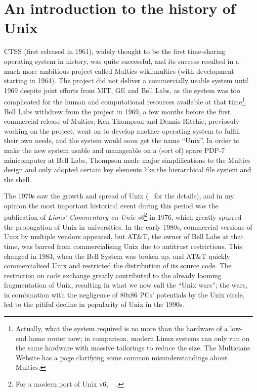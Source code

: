 \newpart
\section{An introduction to the history of Unix}\label{sec:intro}

CTSS (first released in 1961), widely thought to be the
first time-sharing operating system in history, was quite successful, and its
success resulted in a much more ambitious project called Multics\cupercite%
{wiki:multics} (with development starting in 1964).  The project did not deliver
a commercially usable system until 1969 despite
joint efforts from MIT, GE and Bell Labs, as the system was too complicated
for the human and computational resources available at that time\footnote%
{\label{fn:multics}Actually, what the system required is no more than the
hardware of a low-end home router now; in comparison, modern Linux systems can
only run on the same hardware with massive tailorings to reduce the size.  The
Multicians Website has a page clarifying some common
misunderstandings about Multics.}.  Bell Labs withdrew from the project in 1969,
a few months before the first commercial release of Multics; Ken Thompson and
Dennis Ritchie, previosuly working on the project, went on to develop another
operating system to fulfill their own needs, and the system would soon get the
name ``Unix''.  In order to make the new system usable
and manageable on a (sort of) spare PDP-7 minicomputer at Bell Labs, Thompson
made major simplifications to the Multics design and only adopted certain key
elements like the hierarchical file system and the shell.

The 1970s saw the growth and spread of Unix (\cf~\parencite{wiki:unixhist}
for the details), and in my opinion the most important historical event
during this period was the publication of \emph{Lions' Commentary on Unix
v6}\footnote{For a modern port of Unix v6, \cf~%
\parencite{wiki:xv6}.} in 1976, which greatly spurred the propagation of Unix
in universities.  In the early 1980s, commercial versions of Unix by multiple
vendors appeared, but AT\&T, the owner of Bell Labs at that time, was barred
from commercialising Unix due to antitrust restrictions.  This changed in
1983, when the Bell System was broken up, and AT\&T quickly commercialised
Unix and restricted the distribution of its source code.  The restriction on
code exchange greatly contributed to the already looming fragmentation of Unix,
resulting in what we now call the ``Unix wars''; the
wars, in combination with the negligence of 80x86 PCs' potentials by the Unix
circle, led to the pitiful decline in popularity of Unix in the 1990s.

